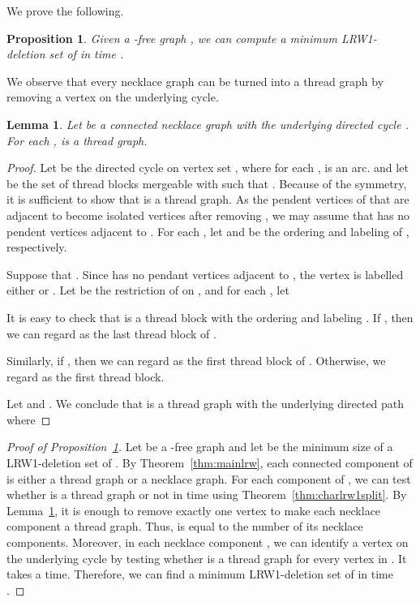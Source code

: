 \documentclass[11pt]{article}
\newtheorem{lemma}[theorem]{Lemma}
\newtheorem{proposition}[theorem]{Proposition}
\theoremstyle{remark}
\begin{document}
We prove the following.
\begin{proposition}\label{prop:nltothread2}
Given a -free graph , we can compute a minimum LRW1-deletion set of  in time .
\end{proposition}

We observe that every necklace graph can be turned into a thread graph by removing a vertex on the underlying cycle.



\begin{lemma} \label{lem:nltothread}
Let  be a connected necklace graph with the underlying directed cycle . For each ,  is a thread graph.
\end{lemma}
\begin{proof}
Let  be the directed cycle  on vertex set , where for each ,  is an arc. 
and let  be the set of thread blocks mergeable with  such that
.
Because of the symmetry, it is sufficient to show that  is a thread graph. 
As the pendent vertices of  that are adjacent to  become isolated vertices after removing , 
we may assume that  has no pendent vertices adjacent to . 
For each , let  and  be the ordering and labeling of , respectively.


Suppose that . 
Since  has no pendant vertices adjacent to , 
the vertex  is labelled either  or .
Let  be the restriction of  on , and
for each , let 

It is easy to check that  
is a thread block with the ordering  and labeling .
If , 
then we can regard  as the last thread block of .



Similarly, 
if , 
then we can regard  as the first thread block of .
Otherwise, we regard  as the first thread block.

Let  and .
We conclude that
 is a thread graph with the underlying directed path  
where

\end{proof}

\begin{proof}[Proof of Proposition~\ref{prop:nltothread2}]
Let  be a -free graph and let  be the minimum size of a LRW1-deletion set of .
By Theorem~\ref{thm:mainlrw},  each connected component of  is either a thread graph or a necklace graph.
For each component  of , we can test whether  is a thread graph or not in time  using Theorem~\ref{thm:charlrw1split}. 
By Lemma~\ref{lem:nltothread}, it is enough to remove exactly one vertex to make  each necklace component a thread graph.
Thus,  is equal to the number of its necklace components. 
Moreover, in each necklace component , we can identify a vertex  on the underlying cycle by testing whether  is a thread graph for every vertex  in .  
It takes a  time.
Therefore, we can find a minimum LRW1-deletion set of  in time .
\end{proof}
\end{document}
